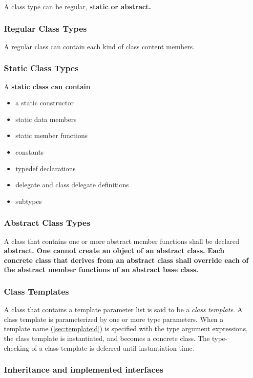 \documentclass[a4paper,oneside,11pt]{article}
\begin{document}
A class type can be regular, \bf{static} or \bf{abstract}.

\subsubsection{Regular Class Types}

A regular class can contain each kind of class content members.

\subsubsection{Static Class Types}

A \bf{static} class can contain
\begin{itemize}
\item a static constructor
\item static data members
\item static member functions
\item constants
\item typedef declarations
\item delegate and class delegate definitions
\item subtypes
\end{itemize}

\subsubsection{Abstract Class Types}

A class that contains one or more abstract member functions shall be declared \bf{abstract}.
One cannot create an object of an abstract class.
Each concrete class that derives from an abstract class shall override each of the
abstract member functions of an abstract base class.

\subsubsection{Class Templates}

A class that contains a template parameter list is said to be a \emph{class template}.
A class template is parameterized by one or more type parameters.
When a template name (\ref{sec:templateid}) is specified with the type argument expressions,
the class template is instantiated, and becomes a concrete class.
The type-checking of a class template is deferred until instantiation time.

\subsubsection{Inheritance and implemented interfaces}
\end{document}

